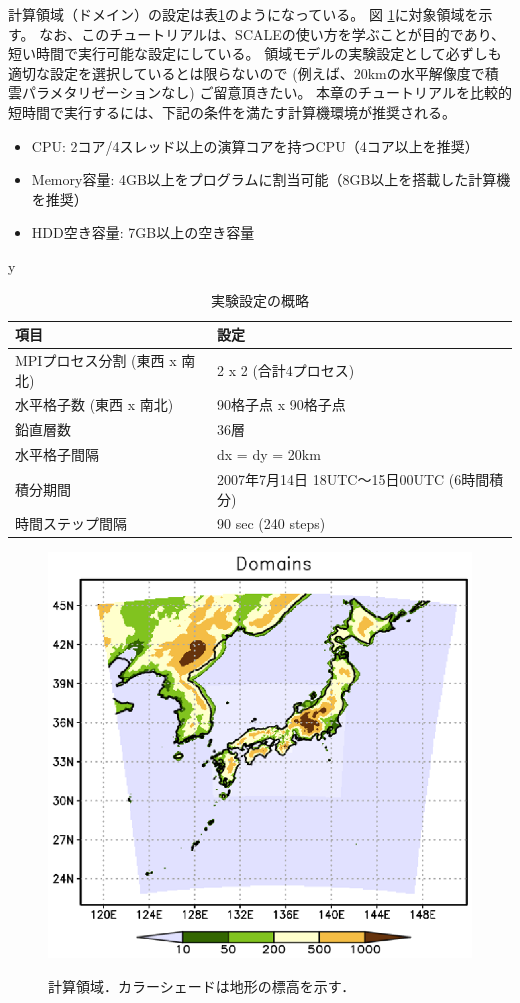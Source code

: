 計算領域（ドメイン）の設定は表\ref{tab:grids}のようになっている。
図 \ref{fig:tutrial_real_domain}に対象領域を示す。
なお、このチュートリアルは、SCALEの使い方を学ぶことが目的であり、
短い時間で実行可能な設定にしている。
領域モデルの実験設定として必ずしも適切な設定を選択しているとは限らないので
(例えば、20kmの水平解像度で積雲パラメタリゼーションなし)
ご留意頂きたい。
本章のチュートリアルを比較的短時間で実行するには、下記の条件を満たす計算機環境が推奨される。
\begin{itemize}
\item CPU: 2コア/4スレッド以上の演算コアを持つCPU（4コア以上を推奨）
\item Memory容量: 4GB以上をプログラムに割当可能（8GB以上を搭載した計算機を推奨）
\item HDD空き容量: 7GB以上の空き容量
\end{itemize}

y%


\begin{table}[h]
\begin{center}
  \caption{実験設定の概略}
  \label{tab:grids}
  \begin{tabularx}{150mm}{|l|X|} \hline
    \rowcolor[gray]{0.9} 項目 & 設定 \\ \hline
    MPIプロセス分割 (東西 x 南北) & 2 x 2 (合計4プロセス) \\ \hline
    水平格子数 (東西 x 南北) & 90格子点 x 90格子点 \\ \hline
    鉛直層数                 & 36層                  \\ \hline
    水平格子間隔             & dx = dy = 20km       \\ \hline
    積分期間 & 2007年7月14日 18UTC～15日00UTC (6時間積分) \\ \hline
    時間ステップ間隔 & 90 sec (240 steps) \\ \hline
  \end{tabularx}
\end{center}
\end{table}

\begin{figure}[tb]
\begin{center}
  \includegraphics[width=0.5\hsize]{./figure/real_domain.eps}\\
  \caption{計算領域．カラーシェードは地形の標高を示す．}
  \label{fig:tutrial_real_domain}
\end{center}
\end{figure}


